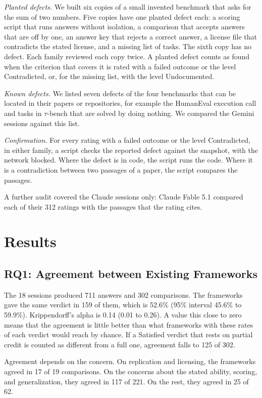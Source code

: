 \documentclass[runningheads]{llncs}
\begin{document}
\emph{Planted defects.} We built six copies of a small invented benchmark that asks for the sum of two numbers. Five copies have one planted defect each: a scoring script that runs answers without isolation, a comparison that accepts answers that are off by one, an answer key that rejects a correct answer, a license file that contradicts the stated license, and a missing list of tasks. The sixth copy has no defect. Each family reviewed each copy twice. A planted defect counts as found when the criterion that covers it is rated with a failed outcome or the level Contradicted, or, for the missing list, with the level Undocumented.

\emph{Known defects.} We listed seven defects of the four benchmarks that can be located in their papers or repositories, for example the HumanEval execution call and tasks in $\tau$-bench that are solved by doing nothing. We compared the Gemini sessions against this list.

\emph{Confirmation.} For every rating with a failed outcome or the level Contradicted, in either family, a script checks the reported defect against the snapshot, with the network blocked. Where the defect is in code, the script runs the code. Where it is a contradiction between two passages of a paper, the script compares the passages.

A further audit covered the Claude sessions only: Claude Fable 5.1 compared each of their 312 ratings with the passages that the rating cites.

\section{Results}
\label{sec:results}

\subsection{RQ1: Agreement between Existing Frameworks}
The 18 sessions produced 711 answers and 302 comparisons. The frameworks gave the same verdict in 159 of them, which is 52.6\% (95\% interval 45.6\% to 59.9\%). Krippendorff's alpha is 0.14 (0.01 to 0.26). A value this close to zero means that the agreement is little better than what frameworks with these rates of each verdict would reach by chance. If a Satisfied verdict that rests on partial credit is counted as different from a full one, agreement falls to 125 of 302.

Agreement depends on the concern. On replication and licensing, the frameworks agreed in 17 of 19 comparisons. On the concerns about the stated ability, scoring, and generalization, they agreed in 117 of 221. On the rest, they agreed in 25 of 62.
\end{document}
